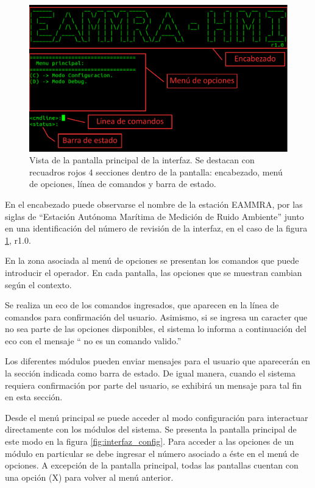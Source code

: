 \begin{figure}[htpb]
	\centering
	\includegraphics[width=\textwidth]{./Figures/interfaz_detalles.pdf}
	\caption[]{Vista de la pantalla principal de la interfaz. Se destacan con recuadros rojos 4 secciones dentro de la pantalla: encabezado, menú de opciones, línea de comandos y barra de estado.}
	\label{fig:interfaz_main}
\end{figure}

En el encabezado puede observarse el nombre de la estación EAMMRA, por las siglas de ``Estación Autónoma Marítima de Medición de Ruido Ambiente'' junto en una identificación del número de revisión de la interfaz, en el caso de la figura \ref{fig:interfaz_main}, r1.0. 

En la zona asociada al menú de opciones se presentan los comandos que puede introducir el operador. En cada pantalla, las opciones que se muestran cambian según el contexto.

Se realiza un eco de los comandos ingresados, que aparecen en la línea de comandos para confirmación del usuario. Asimismo, si se ingresa un caracter que no sea parte de las opciones disponibles, el sistema lo informa a continuación del eco con el mensaje `` no es un comando valido.'' 

Los diferentes módulos pueden enviar mensajes para el usuario que aparecerán en la sección indicada como barra de estado.  De igual manera, cuando el sistema requiera confirmación por parte del usuario, se exhibirá un mensaje para tal fin en esta sección.

Desde el menú principal se puede acceder al modo configuración para interactuar directamente con los módulos del sistema.  Se presenta la pantalla principal de este modo en la figura \ref{fig:interfaz_config}.  Para acceder a las opciones de un módulo en particular se debe ingresar el número asociado a éste en el menú de opciones.  A excepción de la pantalla principal, todas las pantallas cuentan con una opción (X) para volver al menú anterior.

